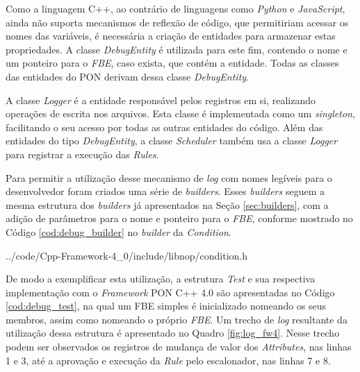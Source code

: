 Como a linguagem C++, ao contrário de linguagens como \textit{Python} e
\textit{JavaScript}, ainda não suporta mecanismos de reflexão de código, que
permitiriam acessar os nomes das variáveis, é necessária a criação de entidades
para armazenar estas propriedades. A classe \textit{DebugEntity} é utilizada
para este fim, contendo o nome e um ponteiro para o \textit{FBE}, caso exista,
que contém a entidade. Todas as classes das entidades do PON derivam dessa
classe \textit{DebugEntity}.

\FloatBarrier

A classe \textit{Logger} é a entidade responsável pelos registros em si,
realizando operações de escrita nos arquivos. Esta classe é implementada como um
\textit{singleton}, facilitando o seu acesso por todas as outras entidades do
código. Além das entidades do tipo \textit{DebugEntity}, a classe
\textit{Scheduler} também usa a classe \textit{Logger} para registrar a execução
das \textit{Rules}.

Para permitir a utilização desse mecanismo de \textit{log} com nomes legíveis
para o desenvolvedor foram criados uma série de \textit{builders}. Esses
\textit{builders} seguem a mesma estrutura dos \textit{builders} já apresentados
na Seção \ref{sec:builders}, com a adição de parâmetros para o nome e ponteiro
para o \textit{FBE}, conforme mostrado no Código \ref{cod:debug_builder} no
\textit{builder} da \textit{Condition}.


            {../code/Cpp-Framework-4_0/include/libnop/condition.h}

De modo a exemplificar esta utilização, a estrutura \textit{Test} e sua
respectiva implementação com o \textit{Framework} PON C++ 4.0 são apresentadas
no Código \ref{cod:debug_test}, na qual um FBE simples é inicializado nomeando
os seus membros, assim como nomeando o próprio \textit{FBE}. Um trecho de
\textit{log} resultante da utilização dessa estrutura é apresentado no Quadro
\ref{fig:log_fw4}. Nesse trecho podem ser observados os registros de mudança de
valor dos \textit{Attributes}, nas linhas 1 e 3, até a aprovação e execução da
\textit{Rule} pelo escalonador, nas linhas 7 e 8.

